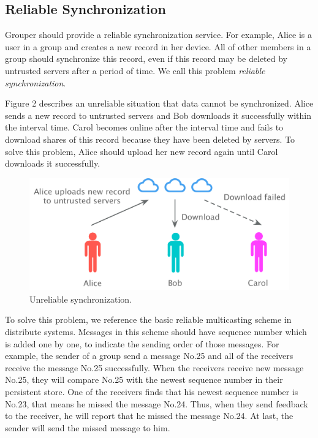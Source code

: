 \documentclass[twocolumn,10pt]{article}
\begin{document}
\subsection{Reliable Synchronization}
Grouper should provide a reliable synchronization service. For example, Alice is a user in a group and creates a new record in her device. All of other members in a group should synchronize this record, even if this record may be deleted by untrusted servers after a period of time. We call this problem \emph{reliable synchronization}.

Figure 2 describes an unreliable situation that data cannot be synchronized. Alice sends a new record to untrusted servers and Bob downloads it successfully within the interval time. Carol becomes online after the interval time and fails to download shares of this record because they have been deleted by servers. To solve this problem, Alice should upload her new record again until Carol downloads it successfully.

\begin{figure}[t]
	\centering
	\includegraphics[scale=0.38]{unreliabe_sync}
	\caption{Unreliable synchronization.}
\end{figure}

To solve this problem, we reference the basic reliable multicasting scheme in distribute systems. Messages in this scheme should have sequence number which is added one by one, to indicate the sending order of those messages. For example, the sender of a group send a message No.25 and all of the receivers receive the message No.25 successfully. When the receivers receive new message No.25, they will compare No.25 with the newest sequence number in their persistent store. One of the receivers finds that his newest sequence number is No.23, that means he missed the message No.24. Thus, when they send feedback to the receiver, he will report that he missed the message No.24. At last, the sender will send the missed message to him.
\end{document}
